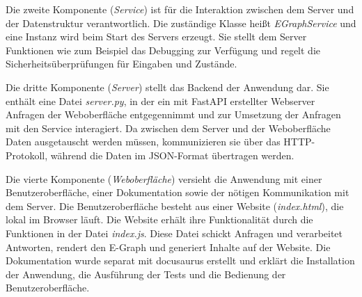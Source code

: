 



Die zweite Komponente (\textit{Service}) ist für die Interaktion zwischen dem Server und der Datenstruktur verantwortlich. Die zuständige Klasse heißt \textit{EGraphService} und 
eine Instanz wird beim Start des Servers erzeugt.
Sie stellt dem Server Funktionen wie zum Beispiel das Debugging zur Verfügung und regelt die Sicherheitsüberprüfungen für Eingaben und Zustände. 



Die dritte Komponente (\textit{Server}) stellt das Backend der Anwendung dar. Sie enthält eine Datei \textit{server.py}, in der ein mit FastAPI erstellter Webserver
Anfragen der Weboberfläche entgegennimmt und zur Umsetzung der Anfragen mit den Service interagiert. Da zwischen dem Server und der Weboberfläche Daten ausgetauscht werden
müssen, kommunizieren sie über das HTTP-Protokoll, während die Daten im JSON-Format übertragen werden.


Die vierte Komponente (\textit{Weboberfläche}) versieht die Anwendung mit einer Benutzeroberfläche, einer Dokumentation sowie der nötigen Kommunikation mit dem Server.
Die Benutzeroberfläche besteht aus einer Website (\textit{index.html}), die lokal im Browser läuft. Die Website erhält ihre Funktionalität durch die Funktionen in der 
Datei \textit{index.js}. Diese Datei schickt Anfragen und verarbeitet Antworten, rendert den E-Graph und generiert Inhalte auf der Website. 
Die Dokumentation wurde separat mit docusaurus erstellt und erklärt die Installation der Anwendung, die Ausführung der Tests und die Bedienung der Benutzeroberfläche.  


